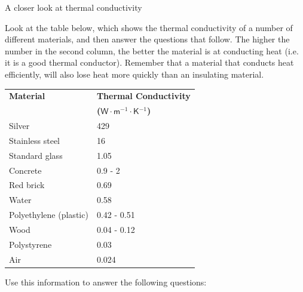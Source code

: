             \begin{Investigation}{A closer look at thermal conductivity}
{            \nopagebreak
      \label{m38706*id66744}Look at the table below, which shows the thermal conductivity of a number of different materials, and then answer the questions that follow. The higher the number in the second column, the better the material is at conducting heat (i.e. it is a good thermal conductor). Remember that a material that conducts heat efficiently, will also lose heat more quickly than an insulating material.\par 
          \begin{table}[H]
        \begin{center}
      \label{m38706*id66753}
    \noindent
      \begin{tabular}{|l|l|}\hline
\textbf{Material} & \textbf{Thermal Conductivity} \\ 
                 &  \textbf{($\mathsf{W}\ensuremath{\cdot}\mathsf{m}{}^{-1}\ensuremath{\cdot}\mathsf{K}{}^{-1}$) } \\ \hline
Silver & 429 \\ \hline
Stainless steel & 16 \\ \hline
Standard glass & 1.05 \\ \hline
Concrete & 0.9 - 2 \\ \hline
Red brick & 0.69 \\ \hline
Water & 0.58 \\ \hline
Polyethylene (plastic) & 0.42 - 0.51 \\ \hline
Wood & 0.04 - 0.12 \\ \hline
Polystyrene & 0.03 \\ \hline
Air & 0.024 \\ \hline
    \end{tabular}
      \end{center}
\end{table}
    \par
      \label{m38706*id67009}Use this information to answer the following questions:\par 
}
\end{Investigation}
